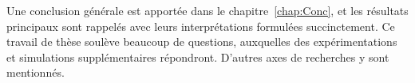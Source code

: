 Une conclusion générale est apportée dans le chapitre~\ref{chap:Conc}, et les résultats principaux sont rappelés avec leurs interprétations formulées succinctement. Ce travail de thèse soulève beaucoup de questions, auxquelles des expérimentations et simulations supplémentaires répondront. D'autres axes de recherches y sont mentionnés.\smallskip




